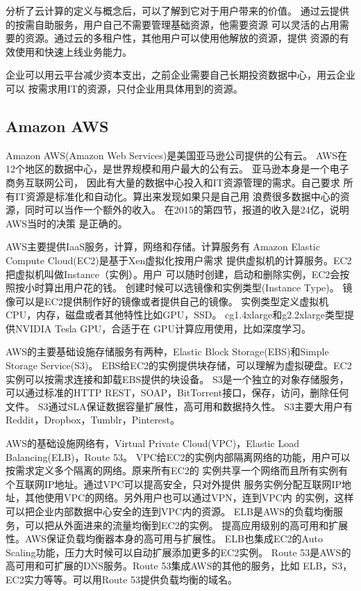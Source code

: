 分析了云计算的定义与概念后，可以了解到它对于用户带来的价值。
通过云提供的按需自助服务，用户自己不需要管理基础资源，他需要资源
可以灵活的占用需要的资源。通过云的多租户性，其他用户可以使用他解放的资源，提供
资源的有效使用和快速上线业务能力。

企业可以用云平台减少资本支出，之前企业需要自己长期投资数据中心，用云企业可以
按需求用IT的资源，只付企业用具体用到的资源。

\subsection{Amazon AWS}
Amazon AWS(Amazon Web Services)是美国亚马逊公司提供的公有云。
AWS在12个地区的数据中心，是世界规模和用户最大的公有云。
亚马逊本身是一个电子商务互联网公司，
因此有大量的数据中心投入和IT资源管理的需求。自己要求
所有IT资源是标准化和自动化。算出来发现如果只是自己用
浪费很多数据中心的资源，同时可以当作一个额外的收入。
在2015的第四节，报道的收入是24亿，说明AWS当时的决策
是正确的。

AWS主要提供IaaS服务，计算，网络和存储。计算服务有
Amazon Elastic Compute Cloud(EC2)是基于Xen虚拟化按用户需求
提供虚拟机的计算服务。EC2把虚拟机叫做Instance（实例）。用户
可以随时创建，启动和删除实例，EC2会按照按小时算出用户花的钱。
创建时候可以选镜像和实例类型(Instance Type)。
镜像可以是EC2提供制作好的镜像或者提供自己的镜像。
实例类型定义虚拟机CPU，内存，磁盘或者其他特性比如GPU，SSD。
cg1.4xlarge和g2.2xlarge类型提供NVIDIA Tesla GPU，合适于在
GPU计算应用使用，比如深度学习。

AWS的主要基础设施存储服务有两种，Elastic Block Storage(EBS)和Simple Storage Service(S3)。
EBS给EC2的实例提供块存储，可以理解为虚拟硬盘。EC2实例可以按需求连接和卸载EBS提供的块设备。
S3是一个独立的对象存储服务，可以通过标准的HTTP REST，SOAP，BitTorrent接口，保存，访问，删除任何文件。
S3通过SLA保证数据容量扩展性，高可用和数据持久性。
S3主要大用户有Reddit，Dropbox，Tumblr，Pinterest。\cite{wiki:s3}

AWS的基础设施网络有，Virtual Private Cloud(VPC)，Elastic Load Balancing(ELB)，Route 53。
VPC给EC2的实例内部隔离网络的功能，用户可以按需求定义多个隔离的网络。原来所有EC2的
实例共享一个网络而且所有实例有个互联网IP地址。通过VPC可以提高安全，只对外提供
服务实例分配互联网IP地址，其他使用VPC的网络。另外用户也可以通过VPN，连到VPC内
的实例，这样可以把企业内部数据中心安全的连到VPC内的资源。
ELB是AWS的负载均衡服务，可以把从外面进来的流量均衡到EC2的实例。
提高应用级别的高可用和扩展性。AWS保证负载均衡器本身的高可用与扩展性。
ELB也集成EC2的Auto Scaling功能，压力大时候可以自动扩展添加更多的EC2实例。
Route 53是AWS的高可用和可扩展的DNS服务。Route 53集成AWS的其他的服务，比如
ELB，S3，EC2实力等等。可以用Route 53提供负载均衡的域名。

